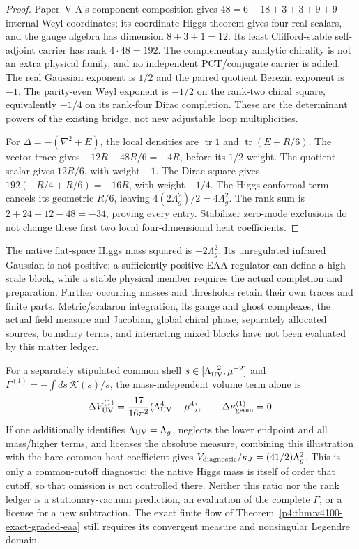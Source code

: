 \documentclass[12pt,a4paper]{article}
\begin{document}
\begin{proof}
Paper~V-A's component composition gives
$48=6+18+3+3+9+9$ internal Weyl coordinates; its coordinate-Higgs
theorem gives four real scalars, and the gauge algebra has dimension
$8+3+1=12$. Its least Clifford-stable self-adjoint carrier has rank
$4\cdot48=192$. The complementary analytic chirality is not an extra
physical family, and no independent PCT/conjugate carrier is added.
The real Gaussian exponent is $1/2$ and the paired quotient Berezin
exponent is $-1$. The parity-even Weyl exponent is $-1/2$ on the
rank-two chiral square, equivalently $-1/4$ on its rank-four Dirac
completion. These are the determinant powers of the existing bridge, not
new adjustable loop multiplicities.

For $\Delta=-(\nabla^2+E)$, the local densities are
$\operatorname{tr}1$ and $\operatorname{tr}(E+R/6)$.
The vector trace gives $-12R+48R/6=-4R$, before its $1/2$
weight. The quotient scalar gives $12R/6$, with weight $-1$.
The Dirac square gives $192(-R/4+R/6)=-16R$, with weight
$-1/4$. The Higgs conformal term cancels its geometric $R/6$,
leaving $4(2\Lambda_g^2)/2=4\Lambda_g^2$.
The rank sum is $2+24-12-48=-34$, proving every entry.
Stabilizer zero-mode exclusions do not change these first two local
four-dimensional heat coefficients.
\end{proof}

\begin{remark}
\label{p4:rem:v2216-graded-matter-scope}
The native flat-space Higgs mass squared is $-2\Lambda_g^2$. Its
unregulated infrared Gaussian is not positive; a sufficiently positive EAA
regulator can define a high-scale block, while a stable physical member
requires the actual completion and preparation. Further occurring masses
and thresholds retain their own traces and finite parts. Metric/scalaron
integration, its gauge and ghost complexes, the actual field measure and
Jacobian, global chiral phase, separately allocated sources, boundary terms,
and interacting mixed blocks have not been evaluated by this matter ledger.

For a separately stipulated common shell
$s\in[\Lambda_{\rm UV}^{-2},\mu^{-2}]$ and
$\Gamma^{(1)}=-\int ds\,\mathcal K(s)/s$, the mass-independent volume
term alone is
\[
 \Delta V_{\rm UV}^{(1)}
 =\frac{17}{16\pi^2}(\Lambda_{\rm UV}^4-\mu^4),\qquad
 \Delta\kappa_{\rm geom}^{(1)}=0.
\]
If one additionally identifies $\Lambda_{\rm UV}=\Lambda_g$, neglects
the lower endpoint and all mass/higher terms, and licenses the absolute
measure, combining this illustration with the bare common-heat coefficient
gives $V_{\rm diagnostic}/\kappa_J=(41/2)\Lambda_g^2$.
This is only a common-cutoff diagnostic: the native Higgs mass is itself
of order that cutoff, so that omission is not controlled there. Neither
this ratio nor the rank ledger is a stationary-vacuum prediction, an
evaluation of the complete $\Gamma$, or a license for a new subtraction.
The exact finite flow of Theorem~\ref{p4:thm:v4100-exact-graded-eaa}
still requires its convergent measure and nonsingular Legendre domain.
\end{remark}
\end{document}
